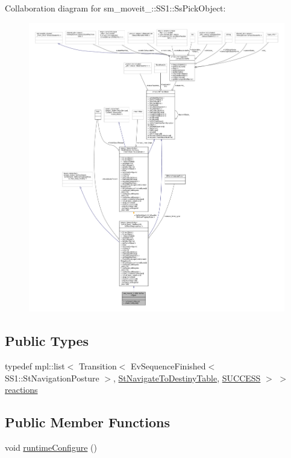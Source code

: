 Collaboration diagram for sm\+\_\+moveit\+\_\+:\+:S\+S1\+:\+:Ss\+Pick\+Object\+:
\nopagebreak
\begin{figure}[H]
\begin{center}
\leavevmode
\includegraphics[width=350pt]{structsm__moveit__4_1_1SS1_1_1SsPickObject__coll__graph}
\end{center}
\end{figure}
\subsection*{Public Types}
\begin{DoxyCompactItemize}
\item 
typedef mpl\+::list$<$ Transition$<$ Ev\+Sequence\+Finished$<$ S\+S1\+::\+St\+Navigation\+Posture $>$, \hyperlink{structsm__moveit__4_1_1StNavigateToDestinyTable}{St\+Navigate\+To\+Destiny\+Table}, \hyperlink{classSUCCESS}{S\+U\+C\+C\+E\+SS} $>$ $>$ \hyperlink{structsm__moveit__4_1_1SS1_1_1SsPickObject_a91d86d49b71983c289daceda785cd5b2}{reactions}
\end{DoxyCompactItemize}
\subsection*{Public Member Functions}
\begin{DoxyCompactItemize}
\item 
void \hyperlink{structsm__moveit__4_1_1SS1_1_1SsPickObject_a00ddf11db72eb417a0e4221426722c02}{runtime\+Configure} ()
\end{DoxyCompactItemize}

